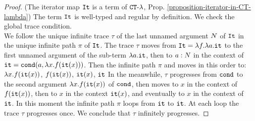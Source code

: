 




\begin{proof}
(The iterator map ${\tt It}$ is a term of ${ {\tt CT}\mbox{-}\lambda}$, Prop. \ref{proposition-iterator-in-CT-lambda})
The term ${\tt It}$ is well-typed and regular by definition. 
We check the global trace condition. 
\\
We follow the unique infinite trace $\tau$ of the last unnamed argument ${N}$ of ${\tt It}$ 
in the unique infinite path $\pi$ of ${\tt It}$. 
The trace $\tau$ moves from  ${\tt It} = \lambda f. \lambda a.{\tt it}$
 to the first unnamed argument of the sub-term $\lambda a.{\tt it}$, 
then to $a:{N}$ in the context of ${\tt it} = {\tt cond} (a, \lambda x.f({\tt it}(x)))$.
Then the infinite path $\pi$ and moves in this order to:
 $\lambda x.f({\tt it}(x))$, $f({\tt it}(x))$, $ {\tt it}(x)$, ${\tt it}$
In the meanwhile, $\tau$ progresses from ${\tt cond}$ to the second argument $\lambda x.f({\tt it}(x))$
of ${\tt cond}$, then moves to $x$ in the context of $f({\tt it}(x))$,
then to $x$ in the context ${\tt it}(x)$, and eventually to $x$ in the context of ${\tt it}$.
In this moment the infinite path $\pi$ loops from ${\tt it}$ to ${\tt it}$. At each loop the trace $\tau$ 
progresses once. We conclude that $\tau$ infinitely progresses.
\end{proof}



